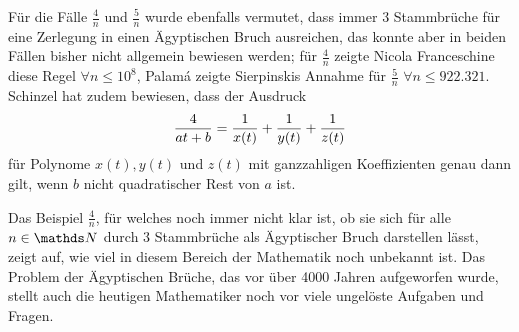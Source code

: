 Für die Fälle $\frac{4}{n}$ und $\frac{5}{n}$ wurde ebenfalls vermutet, dass immer 3 Stammbrüche für eine Zerlegung in einen Ägyptischen Bruch ausreichen, das konnte aber in beiden Fällen bisher nicht allgemein bewiesen werden; für $\frac{4}{n}$ zeigte Nicola Franceschine diese Regel $\forall n \leq 10^8$, Palamá zeigte Sierpinskis Annahme für $\frac{5}{n}$ $\forall n \leq 922.321$. Schinzel hat zudem bewiesen, dass der Ausdruck
$$\frac{4}{at+b} = \frac{1}{x(t)} + \frac{1}{y(t)} + \frac{1}{z(t)}$$
für Polynome $x(t), y(t)$ und $z(t)$ mit ganzzahligen Koeffizienten genau dann gilt, wenn $b$ nicht quadratischer Rest von $a$ ist. \cite[S. 88]{Guy1981}

Das Beispiel $\frac{4}{n}$, für welches noch immer nicht klar ist, ob sie sich für alle $n \in \N$ durch 3 Stammbrüche als Ägyptischer Bruch darstellen lässt, zeigt auf, wie viel in diesem Bereich der Mathematik noch unbekannt ist. Das Problem der Ägyptischen Brüche, das vor über 4000 Jahren aufgeworfen wurde, stellt auch die heutigen Mathematiker noch vor viele ungelöste Aufgaben und Fragen.
